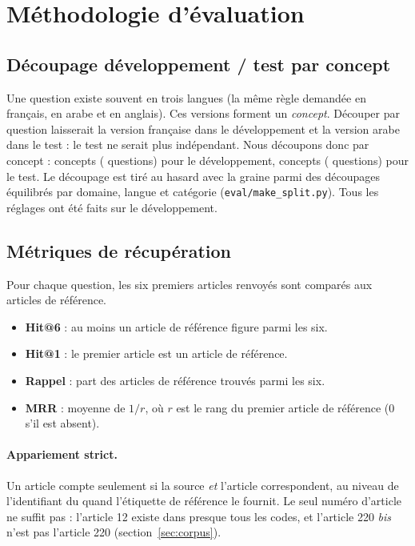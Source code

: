 \section{Méthodologie d'évaluation}\label{sec:methodo}

\subsection{Découpage développement / test par concept}
Une question existe souvent en trois langues (la même règle demandée en français, en arabe et en anglais). Ces versions
forment un \emph{concept}. Découper par question laisserait la version française dans le développement et la version
arabe dans le test : le test ne serait plus indépendant. Nous découpons donc par concept : \NConceptsDev{} concepts
(\NQDev{} questions) pour le développement, \NConceptsTest{} concepts (\NQTest{} questions) pour le test. Le découpage est
tiré au hasard avec la graine \NSeed{} parmi des découpages équilibrés par domaine, langue et catégorie
(\texttt{eval/make\_split.py}). Tous les réglages ont été faits sur le développement.

\subsection{Métriques de récupération}
Pour chaque question, les six premiers articles renvoyés sont comparés aux articles de référence.
\begin{itemize}
  \item \textbf{Hit@6} : au moins un article de référence figure parmi les six.
  \item \textbf{Hit@1} : le premier article est un article de référence.
  \item \textbf{Rappel} : part des articles de référence trouvés parmi les six.
  \item \textbf{MRR} : moyenne de $1/r$, où $r$ est le rang du premier article de référence (0 s'il est absent).
\end{itemize}

\paragraph{Appariement strict.} Un article compte seulement si la source \emph{et} l'article correspondent, au niveau de
l'identifiant du  quand l'étiquette de référence le fournit. Le seul numéro d'article ne suffit pas : l'article 12
existe dans presque tous les codes, et l'article 220 \emph{bis} n'est pas l'article 220 (section~\ref{sec:corpus}).

